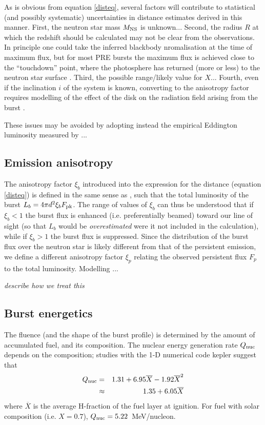 \documentclass{aastex61}
\newcommand{\Xb}{\ensuremath{\overline{X}}}
\begin{document}
As is obvious from equation \ref{disteq}, several factors will contribute to statistical (and possibly systematic) uncertainties in distance estimates derived in this manner. First, the neutron star mass $M_{\rm NS}$ is unknown...
%
Second, the radius $R$ at which the redshift should be calculated may not be clear from the observations. In principle one could take the inferred blackbody nromalisation at the time of maximum flux, but for most PRE bursts the maximum flux is achieved close to the ``touchdown'' point, where the photosphere has returned (more or less) to the neutron star surface \cite[e.g.][]{gal06a}.
%
Third, the possible range/likely value for $X$...
%
Fourth, even if the inclination $i$ of the system is known, converting to the anisotropy factor requires modelling of the effect of the disk on the radiation field arising from the burst \cite[e.g.][]{he16}.

These issues may be avoided by adopting instead the empirical Eddington luminosity measured by \cite[]{kuul03a}...

\subsection{Emission anisotropy}
\label{subsec:anisotropy}

The anisotropy factor $\xi_b$ introduced into the expression for the distance (equation  \ref{disteq}) is defined in the same sense as \citep{fuji88}, such that the total luminosity of the burst $L_b=4\pi d^2\xi_b F_{\rm pk}$. The range of values of $\xi_b$ can thus be understood that if $\xi_b<1$ the burst flux is enhanced (i.e. preferentially beamed) toward our line of sight (so that $L_b$ would be {\it overestimated} were it not included in the calculation), while if $\xi_b>1$ the burst flux is suppressed.
%
Since the distribution of the burst flux over the neutron star is likely different from that of the persistent emission, we define a different anisotropy factor $\xi_p$ relating the observed persistent flux $F_p$ to the total luminosity. Modelling \cite[]{he16}...

{\it describe how we treat this }

\subsection{Burst energetics}
\label{subsec:energetics}

The fluence (and the shape of the burst profile) is determined by the amount of accumulated fuel, and its composition. The nuclear energy generation rate $Q_{\rm nuc}$ depends on the composition; studies with the 1-D numerical code {\sc kepler} suggest that 
\begin{eqnarray}
Q_{\rm nuc} &= & 1.31+6.95\Xb-1.92\Xb^2 \nonumber \\
& \approx & 1.35 + 6.05 \Xb
\end{eqnarray}
\cite[]{goodwin19a} where $\Xb$ is the average H-fraction of the fuel layer at ignition. For fuel with solar composition (i.e. $X=0.7$), $Q_{\rm nuc}=5.22$~MeV/nucleon.
\end{document}
